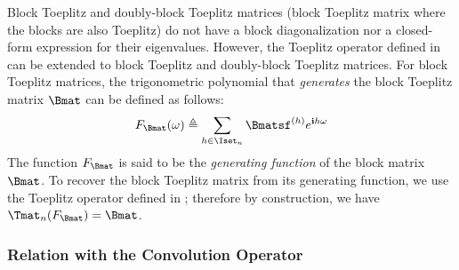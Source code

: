 \noindent
Block Toeplitz and doubly-block Toeplitz matrices (block Toeplitz matrix where the blocks are also Toeplitz) do not have a block diagonalization nor a closed-form expression for their eigenvalues.
However, the Toeplitz operator defined in~ can be extended to block Toeplitz and doubly-block Toeplitz matrices. 
For block Toeplitz matrices, the trigonometric polynomial that \emph{generates} the block Toeplitz matrix $\Bmat$ can be defined as follows:
\begin{equation}
  F_{\Bmat}(\omega) \triangleq \sum_{h \in \Iset_n} \Bmatsf^{(h)} e^{\ci h \omega}
\end{equation}
The function $F_{\Bmat}$ is said to be the \emph{generating function} of the block matrix $\Bmat$.
To recover the block Toeplitz matrix from its generating function, we use the Toeplitz operator defined in ; therefore by construction, we have $\Tmat_n(F_\Bmat) = \Bmat$.







\vspace{1.50cm}
\pagebreak

\subsubsection{Relation with the Convolution Operator}
\label{subsubsection:ch2-relation_with_the_convolution_operator}


